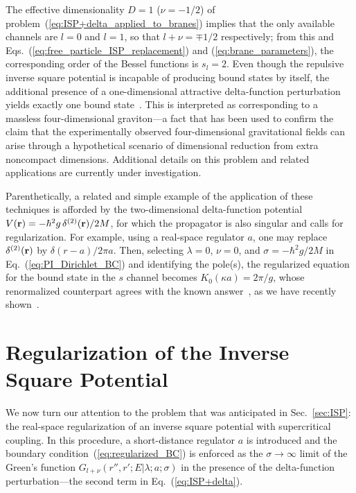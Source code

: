 \documentclass[a4paper,preprint,draft,showpacs,amsmath,amsfonts,amssymb,aps,prd]{revtex4}%
\begin{document}
 The effective dimensionality $D=1$  ($\nu= -1/2$)
of problem~(\ref{eq:ISP+delta_applied_to_branes})
implies that the only available channels are $l=0$ and $l=1$,
so that $l+\nu = \mp 1/2$ respectively;
from this
 and Eqs.~(\ref{eq:free_particle_ISP_replacement}) and (\ref{eq:brane_parameters}),
the corresponding order of the Bessel functions is 
 $s_{l} = 2$. 
Even though
the repulsive inverse square potential is incapable
of producing bound states by itself,
the additional presence of a one-dimensional attractive delta-function perturbation
yields exactly one bound state~\cite{Randall-Sundrum}.
 This is interpreted as corresponding to a massless
four-dimensional graviton---a fact that has been used to confirm the claim that 
the experimentally observed four-dimensional gravitational fields can arise through 
a hypothetical scenario of dimensional
reduction from extra noncompact dimensions.
Additional details on this problem and related applications are currently 
under investigation.

Parenthetically, a related and simple example
of the application of these
techniques is afforded by
the two-dimensional delta-function potential 
$V({\bf r}) = - 
\hbar^{2} g
\,
\delta^{(2)} ({\bf r})/2M$, for which the
propagator is also singular and calls for regularization. 
For example, using
a real-space regulator $a$, one may replace
   $\delta^{(2)}({\bf r})$ by
$ \delta (r-a)/2 \pi a$.
Then, selecting
$\lambda=0$, $\nu=0$, and $\sigma= - \hbar^{2} g/2M$ in
Eq.~(\ref{eq:PI_Dirichlet_BC}) and identifying the pole(s), 
the regularized equation for the bound state in the $s$ channel
becomes
$
 K_{0} (\kappa a) = 2 \pi/g
$,
whose renormalized counterpart agrees with the known 
answer~\cite{delta},
as we have recently shown~\cite{cam:01c}.



\section{Regularization of the Inverse Square Potential}
\label{sec:ISP_regularization}


We now turn our attention to the problem that was anticipated in Sec.~\ref{sec:ISP}:
the real-space regularization of an inverse square potential with supercritical coupling.
In this procedure, a short-distance regulator $a$ is introduced and the
boundary condition~(\ref{eq:regularized_BC}) is enforced
as the
 $\sigma \rightarrow \infty$ limit
of the 
Green's function $G_{l+\nu} (r'', r' ; E| \lambda; a; \sigma)$
in the presence of the delta-function perturbation---the second term
in Eq.~(\ref{eq:ISP+delta}).
\end{document}
